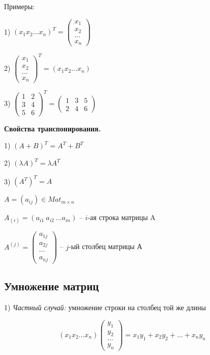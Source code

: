 \vspace{\baselineskip}
Примеры:

1) $(x_1 x_2 \dots x_n)^T = \begin{pmatrix} x_1 \\ x_2 \\ \dots \\ x_n \end{pmatrix}$

2) $\begin{pmatrix} x_1 \\ x_2 \\ \dots \\ x_n \end{pmatrix}^T = (x_1 x_2 \dots x_n)$

3) $\begin{pmatrix} 1 & 2 \\ 3 & 4 \\ 5 & 6 \end{pmatrix}^T = \begin{pmatrix} 1 & 3 & 5 \\ 2 & 4 & 6 \end{pmatrix}$

\vspace{\baselineskip}
\textbf{Свойства транспонирования.}

1) $(A+B)^T = A^T + B^T$

2) $(\lambda A)^T = \lambda A^T$

3) $(A^T)^T = A$

\vspace{\baselineskip}
$A = (a_{ij}) \in Mat_{m \times n}$

$A_{(i)} = (a_{i1}\ a_{i2}\ \dots a_{in})$ -- $i$-ая строка матрицы A

$A^{(j)} = \begin{pmatrix}
    a_{1j} \\
    a_{2j} \\
    \cdots \\
    a_{nj}
	\end{pmatrix}$ -- $j$-ый столбец матрицы А

\vspace{\baselineskip}
\subsection{Умножение матриц}

1) \textit{Частный случай:} умножение строки на столбец той же длины

\begin{equation*}(x_1 x_2 \dots x_n) \begin{pmatrix} y_1 \\ y_2 \\ \dots \\ y_n \end{pmatrix} = x_1 y_1 + x_2 y_2 + \dots + x_n y_n \end{equation*}

